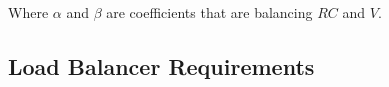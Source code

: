 Where $\alpha$ and $\beta$ are coefficients that are balancing $RC$ and $V$.



\subsection{Load Balancer Requirements}\label{subsec:load-balancer-requirements}
